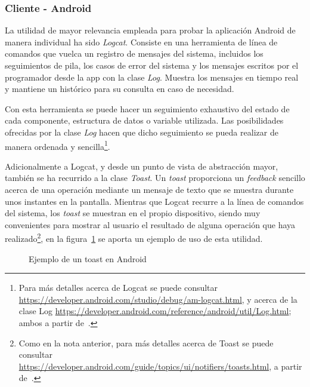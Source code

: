 \subsubsection{Cliente - Android}

La utilidad de mayor relevancia empleada para probar la aplicación Android de manera individual ha sido \emph{Logcat}. Consiste en una herramienta de línea de comandos que vuelca un registro de mensajes del sistema, incluidos los seguimientos de pila, los casos de error del sistema y los mensajes escritos por el programador desde la app con la clase \emph{Log}. Muestra los mensajes en tiempo real y mantiene un histórico para su consulta en caso de necesidad.

Con esta herramienta se puede hacer un seguimiento exhaustivo del estado de cada componente, estructura de datos o variable utilizada. Las posibilidades ofrecidas por la clase \emph{Log} hacen que dicho seguimiento se pueda realizar de manera ordenada y sencilla\footnote{Para más detalles acerca de Logcat se puede consultar \url{https://developer.android.com/studio/debug/am-logcat.html}, y acerca de la clase Log \url{https://developer.android.com/reference/android/util/Log.html}; ambos a partir de~\cite{AnDev}.}.

Adicionalmente a Logcat, y desde un punto de vista de abstracción mayor, también se ha recurrido a la clase \emph{Toast}. Un \emph{toast} proporciona un \textit{feedback} sencillo acerca de una operación mediante un mensaje de texto que se muestra durante unos instantes en la pantalla. Mientras que Logcat recurre a la línea de comandos del sistema, los \emph{toast} se muestran en el propio dispositivo, siendo muy convenientes para mostrar al usuario el resultado de alguna operación que haya realizado\footnote{Como en la nota anterior, para más detalles acerca de Toast se puede consultar \url{https://developer.android.com/guide/topics/ui/notifiers/toasts.html}, a partir de~\cite{AnDev}.}, en la figura~\ref{fig:ejemploToast} se aporta un ejemplo de uso de esta utilidad.

\begin{figure}
	\centering
	\caption{Ejemplo de un toast en Android}
	\label{fig:ejemploToast}
\end{figure}

